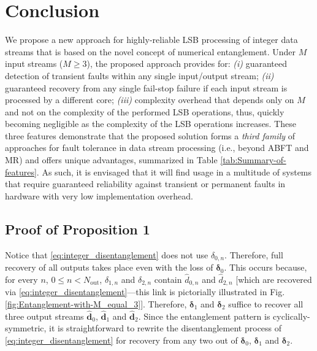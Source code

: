 \documentclass[twocolumn,english,onecolumn]{IEEEtran}
\theoremstyle{plain}
\theoremstyle{plain}
\begin{document}
\section{Conclusion\label{sec:Conclusions}}

We propose a new approach for highly-reliable LSB processing of integer
data streams that is based on the novel concept of numerical entanglement.
Under $M$ input streams ($M\geq3$), the proposed approach provides
for: \emph{(i)} guaranteed detection of transient faults within any
single input/output stream; \emph{(ii)} guaranteed recovery from any
single fail-stop failure if each input stream is processed by a different
core; \emph{(iii)} complexity overhead that depends only on $M$ and
not on the complexity of the performed LSB operations, thus, quickly
becoming negligible as the complexity of the LSB operations increases.
These three features demonstrate that the proposed solution forms
a \emph{third family} of approaches for fault tolerance in data stream
processing (i.e., beyond ABFT and MR) and offers unique advantages,
summarized in Table \ref{tab:Summary-of-features}. As such, it is
envisaged that it will find usage in a multitude of systems that require
guaranteed reliability against transient or permanent faults in hardware
with very low implementation overhead. 


\appendix{}


\subsection{Proof of Proposition 1}
\begin{IEEEproof}
Notice that \eqref{eq:integer_disentanglement} does not use $\delta_{0,n}$.
Therefore, full recovery of all outputs takes place even with the
loss of $\mathbf{\mathbf{\delta}}_{0}$. This occurs because, for
every $n$, $0\leq n<N_{\text{out}}$, $\delta_{1,n}$ and $\delta_{2,n}$
contain $\hat{d}_{0,n}$ and $\hat{d}_{2,n}$ {[}which are recovered
via \eqref{eq:integer_disentanglement}---this link is pictorially
illustrated in Fig. \ref{fig:Entanglement-with-M_equal_3}{]}. Therefore,
$\boldsymbol{\delta}_{1}$ and $\boldsymbol{\delta}_{2}$ suffice
to recover all three output streams $\hat{\boldsymbol{\mathbf{d}}}_{0}$,
$\hat{\mathbf{d}}_{1}$ and $\hat{\mathbf{d}}_{2}$. Since the entanglement
pattern is cyclically-symmetric, it is straightforward to rewrite
the disentanglement process of \eqref{eq:integer_disentanglement}
for recovery from any two out of $\boldsymbol{\delta}_{0}$, $\boldsymbol{\delta}_{1}$
and $\boldsymbol{\delta}_{2}$. 
\end{IEEEproof}
\end{document}
